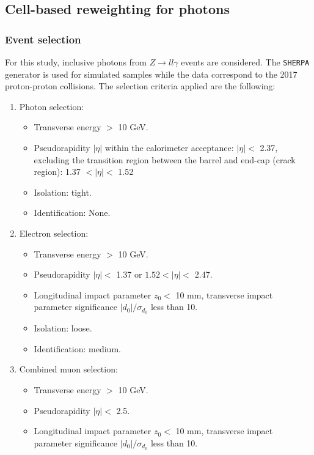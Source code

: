 \subsection{Cell-based reweighting for photons}
\label{gamma:ss:reweighting:photon}

\subsubsection{Event selection}
\label{gamma:ss:reweighting:photon:RadZSel}
For this study, inclusive photons from $Z\rightarrow ll\gamma$ events are considered. The \verb|SHERPA| generator is used for simulated samples while the data correspond to the 2017 proton-proton collisions. The selection criteria applied are the following:
\begin{enumerate}
    \item Photon selection:  
    \begin{itemize}
    \item Transverse energy \eT $> $  10 GeV.
    \item Pseudorapidity $|\eta|$ within the calorimeter acceptance: $|\eta| < $ 2.37, excluding the transition region between the barrel and end-cap (crack region): 1.37 $ < |\eta| < $ 1.52
    \item Isolation: tight.
    \item Identification: None. 
\end{itemize}
    \item Electron selection:
    \begin{itemize}
        \item Transverse energy \eT $> $  10 GeV.
        \item Pseudorapidity $|\eta| < $ 1.37 or $1.52 < |\eta| < $ 2.47.
        \item Longitudinal impact parameter $z_0 < $ 10 mm, transverse impact parameter significance $|d_0|/\sigma_{d_0}$ less than 10.
        \item Isolation: loose.
        \item Identification: medium.
    \end{itemize}
    \item Combined muon selection: 
    \begin{itemize}
        \item Transverse energy \eT $> $  10 GeV.
        \item Pseudorapidity $|\eta| < $ 2.5.
        \item Longitudinal impact parameter $z_0 < $ 10 mm, transverse impact parameter significance $|d_0|/\sigma_{d_0}$ less than 10.

\end{itemize}
\end{enumerate}
